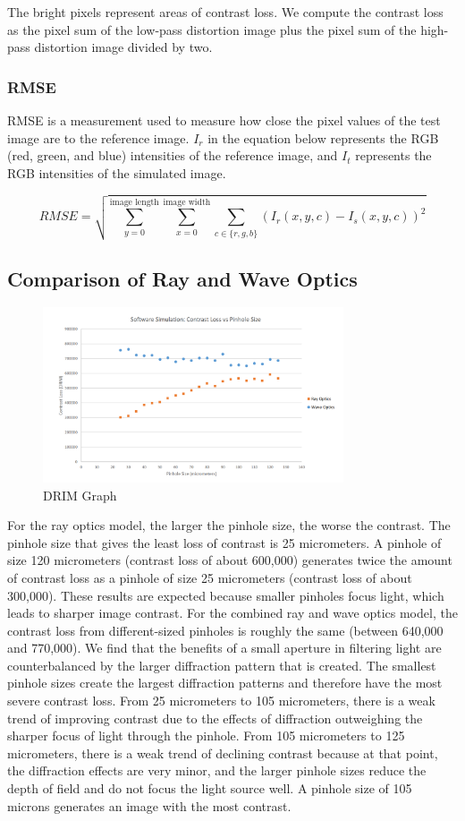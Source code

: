 \documentclass{acmsiggraph}
\begin{document}
The bright pixels represent areas of contrast loss. We compute the contrast loss as the pixel sum of the low-pass distortion image plus the pixel sum of the high-pass distortion image divided by two. 

\subsubsection{RMSE}

RMSE is a measurement used to measure how close the pixel values of the test image are to the reference image. $I_r$ in the equation below represents the RGB (red, green, and blue) intensities of the reference image, and $I_t$ represents the RGB intensities of the simulated image.

$$RMSE = \sqrt{ \sum_{y = 0}^{\text{image length}} \sum_{x = 0}^{\text{image width}} \sum_{c \in \{r,g,b\}} (I_r (x,y,c) - I_s(x,y,c))^2}$$

\subsection{Comparison of Ray and Wave Optics}

\begin{figure}[ht]
  \centering
  \includegraphics[width=3.5in]{Contrast_Loss.png}
  \caption{DRIM Graph}
  \label{fig:ferrari}
\end{figure}

For the ray optics model, the larger the pinhole size, the worse the contrast. The pinhole size that gives the least loss of contrast is 25 micrometers. A pinhole of size 120 micrometers (contrast loss of about 600,000) generates twice the amount of contrast loss as a pinhole of size 25 micrometers (contrast loss of about 300,000). These results are expected because smaller pinholes focus light, which leads to sharper image contrast. For the combined ray and wave optics model, the contrast loss from different-sized pinholes is roughly the same (between 640,000 and 770,000). We find that the benefits of a small aperture in filtering light are counterbalanced by the larger diffraction pattern that is created. The smallest pinhole sizes create the largest diffraction patterns and therefore have the most severe contrast loss. From 25 micrometers to 105 micrometers, there is a weak trend of improving contrast due to the effects of diffraction outweighing the sharper focus of light through the pinhole. From 105 micrometers to 125 micrometers, there is a weak trend of declining contrast because at that point, the diffraction effects are very minor, and the larger pinhole sizes reduce the depth of field and do not focus the light source well. A pinhole size of 105 microns generates an image with the most contrast.
\end{document}
